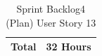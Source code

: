 \documentclass[12pt]{report}
\begin{document}
\begin{table}[h]
{\begin{tabular}{|cc|cccccccccc|}
\multicolumn{2}{|c|}{\textbf{Total}}                                                                                                                                                   & \multicolumn{10}{c|}{32   Hours}                                                                                                                                                                                                                                                                                                                                                                                                                                                                                                                                                                                                                                                                                                                                                                                                                                                                                                                                                                                                                                                                                                                               \\ \hline
\end{tabular}
}
\caption{Sprint Backlog4 (Plan) User Story 13}
\label{tab:mytable}
\end{table}
\end{document}
